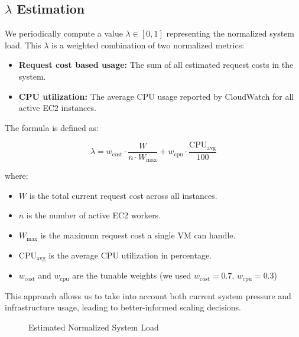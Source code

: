 \documentclass[conference]{IEEEtran}
\begin{document}
\subsection{$\lambda$ Estimation}

We periodically compute a value $\lambda \in [0,1]$ representing the normalized
system load. This $\lambda$ is a weighted combination of two normalized metrics:

\begin{itemize}
    \item \textbf{Request cost based usage:} The sum of all estimated request
    costs in the system.
    \item \textbf{CPU utilization:} The average CPU usage reported by CloudWatch
    for all active EC2 instances.
\end{itemize}

The formula is defined as:

\begin{equation}
\lambda = w_{\text{cost}} \cdot \frac{W}{n \cdot W_{\max}} + w_{\text{cpu}} \cdot \frac{\text{CPU}_{\text{avg}}}{100}
\end{equation}

where:

\begin{itemize}
    \item $W$ is the total current request cost across all instances.
    \item $n$ is the number of active EC2 workers.
    \item $W_{\max}$ is the maximum request cost a single VM can handle.
    \item $\text{CPU}_{\text{avg}}$ is the average CPU utilization in
    percentage.
    \item $w_{\text{cost}}$ and $w_{\text{cpu}}$ are the tunable weights (we
    used $w_{\text{cost}} = 0.7$, $w_{\text{cpu}} = 0.3$)
\end{itemize}

This approach allows us to take into account both current system pressure and
infrastructure usage, leading to better-informed scaling decisions.

\begin{figure}
\caption{Estimated Normalized System Load}
\label{fig:normalized-load}
\end{figure}
\end{document}

